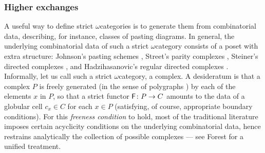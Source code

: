\subsubsection*{Higher exchanges}

A useful way to define strict \( \omega \)\nbd categories is to generate them from combinatorial data, describing, for instance, classes of pasting diagrams.
In general, the underlying combinatorial data of such a strict \( \omega \)\nbd category consists of a poset with extra structure: Johnson's pasting schemes \cite{johnson1989pasting}, Street's parity complexes \cite{street1991parity}, Steiner's directed complexes \cite{steiner1993algebra}, and Hadzihasanovic's regular directed complexes \cite{hadzihasanovic2024combinatorics}.
Informally, let us call such a strict \( \omega \)\nbd category, a complex. 
A desideratum is that a complex \( P \) is freely generated (in the sense of polygraphs \cite{burroni1993higher}) by each of the elements \( x \) in \( P \), so that a strict functor \( \mathsf{F} \colon P \to C \) amounts to the data of a globular cell \( c_x \in C \) for each \( x \in P \) (satisfying, of course, appropriate boundary conditions).
For this \emph{freeness condition} to hold, most of the traditional literature imposes certain acyclicity conditions on the underlying combinatorial data, hence restrains analytically the collection of possible complexes --- see Forest \cite{forest2022pasting} for a unified treatment.

